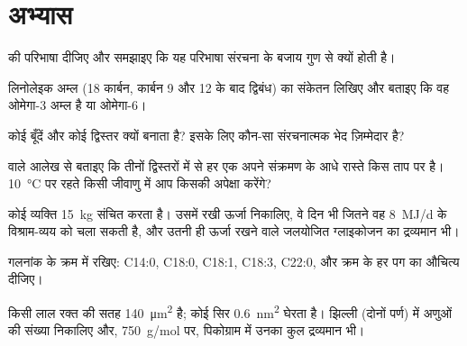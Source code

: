 \section{अभ्यास}

\begin{exercise}[$\star$]\label{exo:b1:lipids:1}
 की परिभाषा दीजिए और समझाइए कि यह परिभाषा संरचना के बजाय गुण से
क्यों होती है।
\end{exercise}

\begin{exercise}[$\star$]\label{exo:b1:lipids:2}
लिनोलेइक अम्ल (18 कार्बन, कार्बन 9 और 12 के बाद द्विबंध) का संकेतन
लिखिए और बताइए कि वह ओमेगा-3 अम्ल है या ओमेगा-6।
\end{exercise}

\begin{exercise}[$\star$]\label{exo:b1:lipids:3}
कोई  बूँदें और कोई  द्विस्तर क्यों बनाता है?
इसके लिए कौन-सा संरचनात्मक भेद ज़िम्मेदार है?
\end{exercise}

\begin{exercise}[$\star$]\label{exo:b1:lipids:4}
 वाले आलेख से बताइए कि तीनों द्विस्तरों में से हर एक अपने संक्रमण
के आधे रास्ते किस ताप पर है। \qty{10}{\celsius} पर रहते किसी जीवाणु में
आप किसकी अपेक्षा करेंगे?
\end{exercise}

\begin{exercise}[$\star\star$]\label{exo:b1:lipids:5}
कोई व्यक्ति \qty{15}{kg}  संचित करता है। उसमें रखी ऊर्जा निकालिए, वे
दिन भी जितने वह \qty{8}{MJ/d} के विश्राम-व्यय को चला सकती है, और उतनी ही
ऊर्जा रखने वाले जलयोजित ग्लाइकोजन का द्रव्यमान भी।
\end{exercise}

\begin{exercise}[$\star\star$]\label{exo:b1:lipids:6}
गलनांक के क्रम में रखिए: C14:0, C18:0, C18:1, C18:3, C22:0, और क्रम के
हर पग का औचित्य दीजिए।
\end{exercise}

\begin{exercise}[$\star\star$]\label{exo:b1:lipids:7}
किसी लाल रक्त  की सतह \qty{140}{\micro m^2} है; कोई
 सिर \qty{0.6}{nm^2} घेरता है। झिल्ली (दोनों पर्ण) में
 अणुओं की संख्या निकालिए और, \qty{750}{g/mol} पर,
पिकोग्राम में उनका कुल द्रव्यमान भी।
\end{exercise}

